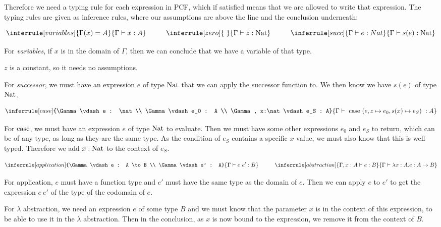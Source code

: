 Therefore we need a typing rule for each expression in PCF, which if satisfied means that we are allowed to write that expression. The typing rules are given as inference rules, where our assumptions are above the line and the conclusion underneath:

$$
\inferrule [variables]{ \Gamma(x) = A }
 {\Gamma \vdash x : A}
\hspace{1cm}
\inferrule [zero]{ \ }
 {\Gamma \vdash z : \nat}
\hspace{1cm}
\inferrule [succ]{ \Gamma \vdash e : Nat }
 {\Gamma \vdash s(e) : \nat}
$$

For \emph{variables}, if $x$ is in the domain of $\Gamma$, then we can conclude that we have a variable of that type.

$z$ is a constant, so it needs no assumptions.

For \emph{successor}, we must have an expression $e$ of type $\operatorname{Nat}$ that we can apply the successor function to. We then know we have $s(e)$ of type $\operatorname{Nat}$.

$$
\inferrule [case]{\Gamma \vdash e : \nat \\  \Gamma \vdash e_0 : A \\  \Gamma , x:\nat\vdash e_S : A}
  {\Gamma \vdash \ \case \ (e, z \mapsto e_0 , s(x) \mapsto e_S) \  : A}  
$$

For $\operatorname{case}$, we must have an expression $e$ of type $\operatorname{Nat}$ to evaluate. Then we must have some other expressions $e_0$ and $e_S$ to return, which can be of any type, as long as they are the same type. As the condition of $e_S$ contains a specific $x$ value, we must also know that this is well typed. Therefore we add $x : \operatorname{Nat}$ to the context of $e_S$.

$$
\inferrule [application]{\Gamma \vdash e : A \to B \\  \Gamma \vdash e' : A}
  {\Gamma \vdash e \ e' : B}
  \hspace{1cm}
\inferrule [abstraction] {\Gamma , x : A \vdash  e : B}
  {\Gamma \vdash \lambda x : A. e : A \to B}  
$$

For application, $e$ must have a function type and $e'$ must have the same type as the domain of $e$. Then we can apply $e$ to $e'$ to get the expression $e \ e'$ of the type of the codomain of $e$.

For $\lambda$ abstraction, we need an expression $e$ of some type $B$ and we must know that the parameter $x$ is in the context of this expression, to be able to use it in the $\lambda$ abstraction. Then in the conclusion, as $x$ is now bound to the expression, we remove it from the context of $B$.

